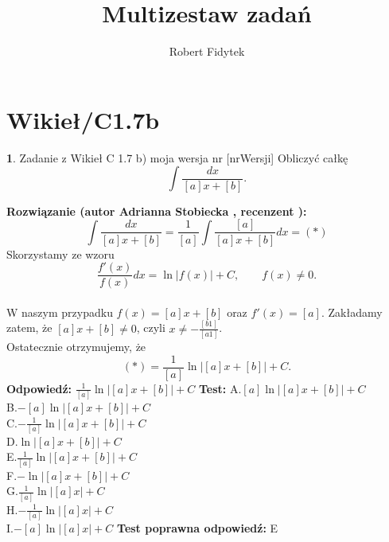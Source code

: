 \documentclass[12pt, a4paper]{article}
\title{Multizestaw zadań}
\author{Robert Fidytek}
\date{}
\theoremstyle{definition} %
\newtheorem{zad}{}
\newcommand{\kategoria}[1]{\section{#1}} %
\newcommand{\zadStart}[1]{\begin{zad}#1\newline} %
\newcommand{\zadStop}{\end{zad}}   %
\newcommand{\rozwStart}[2]{\noindent \textbf{Rozwiązanie (autor #1 , recenzent #2): }\newline} %
\newcommand{\rozwStop}{\newline}                                            %
\newcommand{\odpStart}{\noindent \textbf{Odpowiedź:}\newline}    %
\newcommand{\odpStop}{\newline}                                             %
\newcommand{\testStart}{\noindent \textbf{Test:}\newline} %
\newcommand{\testStop}{\newline} %
\newcommand{\kluczStart}{\noindent \textbf{Test poprawna odpowiedź:}\newline} %
\newcommand{\kluczStop}{\newline} %
\begin{document}
\maketitle


\kategoria{Wikieł/C1.7b}
\zadStart{Zadanie z Wikieł C 1.7 b) moja wersja nr [nrWersji]}
Obliczyć całkę
$$\int\frac{dx}{[a]x+[b]}.$$
\zadStop
\rozwStart{Adrianna Stobiecka}{}
$$\int\frac{dx}{[a]x+[b]}=\frac{1}{[a]}\int\frac{[a]}{[a]x+[b]}dx=(*)$$
Skorzystamy ze wzoru $$\frac{f'(x)}{f(x)}dx=\ln{|f(x)|}+C, \qquad f(x)\ne0.$$
\\W naszym przypadku $f(x)=[a]x+[b]$ oraz $f'(x)=[a]$. Zakładamy zatem, że $[a]x+[b]\ne0$, czyli $x\ne-\frac{[b1]}{[a1]}$.
\\Ostatecznie otrzymujemy, że 
$$(*)=\frac{1}{[a]}\ln{|[a]x+[b]|}+C.$$
\rozwStop
\odpStart
$\frac{1}{[a]}\ln{|[a]x+[b]|}+C$
\odpStop
\testStart
A.$[a]\ln{|[a]x+[b]|}+C$\\
B.$-[a]\ln{|[a]x+[b]|}+C$\\
C.$-\frac{1}{[a]}\ln{|[a]x+[b]|}+C$\\
D.$\ln{|[a]x+[b]|}+C$\\
E.$\frac{1}{[a]}\ln{|[a]x+[b]|}+C$\\
F.$-\ln{|[a]x+[b]|}+C$\\
G.$\frac{1}{[a]}\ln{|[a]x|}+C$\\
H.$-\frac{1}{[a]}\ln{|[a]x|}+C$\\
I.$-[a]\ln{|[a]x|}+C$
\testStop
\kluczStart
E
\kluczStop
\end{document}
